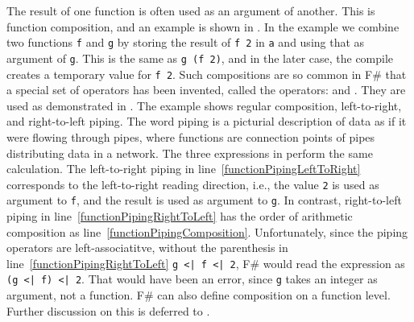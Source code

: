 \documentclass[fsharpNotes.tex]{subfiles}
\begin{document}
The result of one function is often used as an argument of another. This is function composition, and an example is shown in .
%
%
In the example we combine two functions \lstinline{f} and \lstinline{g} by storing the result of \lstinline{f 2} in \lstinline{a} and using that as argument of \lstinline{g}. This is the same as \lstinline{g (f 2)}, and in the later case, the compile creates a temporary value for \lstinline{f 2}. Such compositions are so common in F\# that a special set of operators has been invented, called the  operators: \idx[{|>}@\lstinline{|>}]{\lexeme{|>}} and \idx[{<|}@\lstinline{<|}]{\lexeme{<|}}. They are used as demonstrated in .
%
%
The example shows regular composition, left-to-right, and right-to-left piping. The word piping is a picturial description of data as if it were flowing through pipes, where functions are connection points of pipes distributing data in a network. The three expressions in  perform the same calculation. The left-to-right piping in line~\ref{functionPipingLeftToRight} corresponds to the left-to-right reading direction, i.e., the value \lstinline{2} is used as argument to \lstinline{f}, and the result is used as argument to \lstinline{g}. In contrast, right-to-left piping in line~\ref{functionPipingRightToLeft} has the order of arithmetic composition as line~\ref{functionPipingComposition}. Unfortunately, since the piping operators are left-associatitve, without the parenthesis in line~\ref{functionPipingRightToLeft} \mbox{\lstinline{g <| f <| 2}}, F\# would read the expression as \lstinline{(g <| f) <| 2}. That would have been an error, since \lstinline{g} takes an integer as argument, not a function. F\# can also define composition on a function level. Further discussion on this is deferred to .

\end{document}
